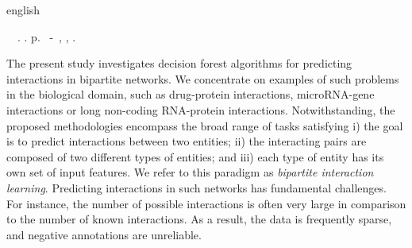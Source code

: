 \begin{resumo}[Abstract]
 \begin{otherlanguage*}{english}
	\begin{flushleft} 
		\setlength{\absparsep}{0pt} %
 		\SingleSpacing  		\imprimirautorabr~~\textbf{\imprimirtitleabstract}.	\imprimirdata.  \pageref{LastPage}p. 
		\imprimirtipotrabalhoabs~-~\imprimirinstituicao, \imprimirlocal, 	\imprimirdata. 
 	\end{flushleft}
	\OnehalfSpacing 
	
	The present study investigates decision forest algorithms for predicting interactions in bipartite networks.
	We concentrate on examples of such problems in the biological domain, such as drug-protein interactions, microRNA-gene interactions or long non-coding RNA-protein interactions.
	Notwithstanding, the proposed methodologies encompass
	the broad range of tasks satisfying i) the goal is to predict interactions between two entities; ii) the interacting pairs are composed of two different types of entities; and iii) each type of entity has its own set of input features. We refer to this paradigm as \emph{bipartite interaction learning}.  %
	Predicting interactions in such networks has fundamental challenges. For instance, the number of possible interactions is often very large in comparison to the number of known interactions. As a result, the data is frequently sparse, and negative annotations are unreliable.

\end{otherlanguage*}
\end{resumo}
